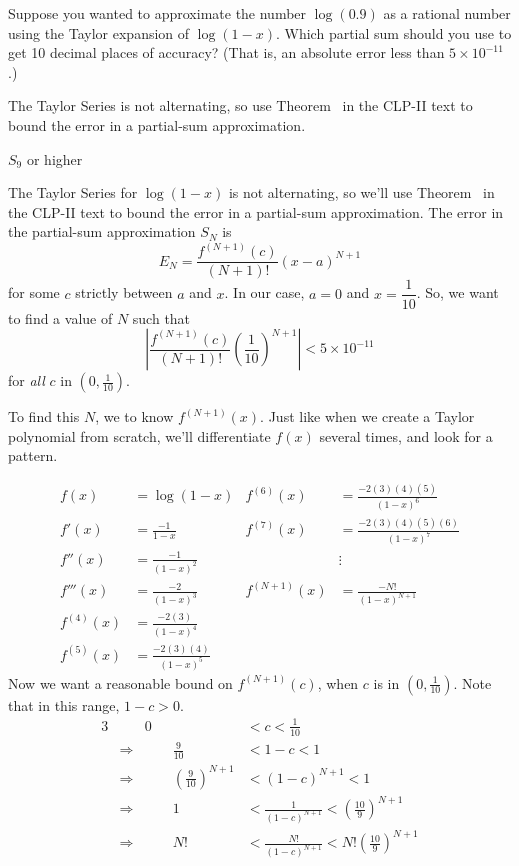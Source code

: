 \begin{Mquestion}
Suppose you wanted to approximate the number $\log(0.9)$ as a rational number using the Taylor expansion of $\log(1-x)$. Which partial sum should you use to get 10 decimal places of accuracy?
(That is, an absolute error less than $5\times10^{-11}$.)
\end{Mquestion}
\begin{hint}
The Taylor Series is not alternating, so use  Theorem~ in the CLP-II text to bound the error in a partial-sum approximation.
\end{hint}
\begin{answer}
	$S_9$ or higher
\end{answer}
\begin{solution}
The Taylor Series for $\log(1-x)$ is not alternating, so we'll use  Theorem~ in the CLP-II text to bound the error in a partial-sum approximation. The error in the partial-sum approximation $S_N$ is
\[E_N=\frac{f^{(N+1)}(c)}{(N+1)!}(x-a)^{N+1}\]
for some $c$ strictly between $a$ and $x$. In our case, $a=0$ and $x=\dfrac1{10}$. So, we want to find a value of $N$ such that
\[\left|\frac{f^{(N+1)}(c)}{(N+1)!}\left(\frac{1}{10}\right)^{N+1}\right|<5\times 10^{-11}\]
for \emph{all} $c$ in $(0,\frac1{10})$.

To find this $N$, we to know $f^{(N+1)}(x)$. Just like when we create a Taylor polynomial from scratch, we'll differentiate $f(x)$ several times, and look for a pattern.

\begin{align*}
f(x)&=\log(1-x)&f^{(6)}(x)&=\frac{-2(3)(4)(5)}{(1-x)^6}\\
f'(x)&=\frac{-1}{1-x}&f^{(7)}(x)&=\frac{-2(3)(4)(5)(6)}{(1-x)^7}\\
f''(x)&=\frac{-1}{(1-x)^2}&&\vdots\\
f'''(x)&=\frac{-2}{(1-x)^3}&f^{(N+1)}(x)&=\frac{-N!}{(1-x)^{N+1}}\\
f^{(4)}(x)&=\frac{-2(3)}{(1-x)^4}\\
f^{(5)}(x)&=\frac{-2(3)(4)}{(1-x)^5}
\end{align*}
Now we want a reasonable bound on $f^{(N+1)}(c)$, when $c$ is in $(0,\frac{1}{10})$. Note that in this range, $1-c>0$.
\begin{alignat*}{3}
&&0 &<c<\frac{1}{10}\\
&\Rightarrow&\qquad \frac{9}{10} &<1-c<1\\
&\Rightarrow&\qquad \left(\frac{9}{10}\right)^{N+1} &<(1-c)^{N+1}<1\\
&\Rightarrow&\qquad 1&<\frac{1}{(1-c)^{N+1}}<\left(\frac{10}{9}\right)^{N+1}\\
&\Rightarrow&\qquad N!&<\frac{N!}{(1-c)^{N+1}}<N!\left(\frac{10}{9}\right)^{N+1}
\end{alignat*}


\end{solution}
